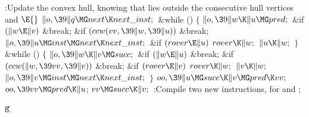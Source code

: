\B{}:Update the convex hull, knowing that  lies outside the
consecutive hull vertices  and \X${}\E{}$\6
$\|o,\39\|q\MG\\{next}\K\\{next\_inst};{}$\6
\&{while} ()\5
${}\{{}$\1\6
${}\|o,\39\|w\K\|u\MG\\{pred};{}$\6
\&{if} ${}(\|w\E\|v){}$\1\5
\&{break};\2\6
\&{if} ${}(\\{ccw}(\\{vv},\39\|w,\39\|u)){}$\1\5
\&{break};\2\6
${}\|o,\39\|u\MG\\{inst}\MG\\{next}\K\\{next\_inst};{}$\6
\&{if} ${}(\\{rover}\E\|u){}$\1\5
${}\\{rover}\K\|w;{}$\2\6
${}\|u\K\|w;{}$\6
\4${}\}{}$\2\6
\&{while} ()\5
${}\{{}$\1\6
${}\|o,\39\|w\K\|v\MG\\{succ};{}$\6
\&{if} ${}(\|w\E\|u){}$\1\5
\&{break};\2\6
\&{if} ${}(\\{ccw}(\|w,\39\\{vv},\39\|v)){}$\1\5
\&{break};\2\6
\&{if} ${}(\\{rover}\E\|v){}$\1\5
${}\\{rover}\K\|w;{}$\2\6
${}\|v\K\|w;{}$\6
${}\|o,\39\|v\MG\\{inst}\MG\\{next}\K\\{next\_inst};{}$\6
\4${}\}{}$\2\6
${}\\{oo},\39\|u\MG\\{succ}\K\|v\MG\\{pred}\K\\{vv};{}$\6
${}\\{oo},\39\\{vv}\MG\\{pred}\K\|u{}$;\5
${}\\{vv}\MG\\{succ}\K\|v;{}$\6
:Compile two new instructions, for  and \X;\par
\U8.\fi


